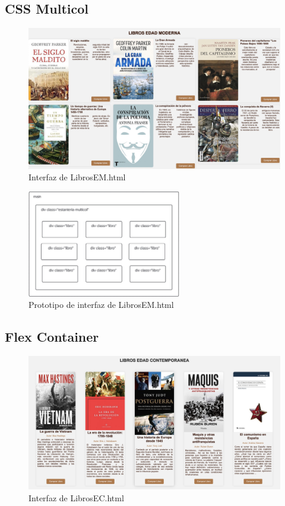 \documentclass{article}
\begin{document}
\subsection{CSS Multicol}

\begin{figure}[H]
    \centering
    \includegraphics[width=1\textwidth]{cssFotos/multicol.jpg}
    \caption{Interfaz de LibrosEM.html}
    \label{fig:foro_interface}
\end{figure}

\begin{figure}[H]
    \centering
    \includegraphics[width=0.6\textwidth]{cssFotos/multicolEsquema.jpg}
    \caption{Prototipo de interfaz de LibrosEM.html}
    \label{fig:prototipo_foro}
\end{figure}


\newpage

\subsection{Flex Container}

\begin{figure}[H]
    \centering
    \includegraphics[width=1\textwidth]{cssFotos/flexContainer.jpg}
    \caption{Interfaz de LibrosEC.html}
    \label{fig:foro_interface}
\end{figure}
\end{document}
